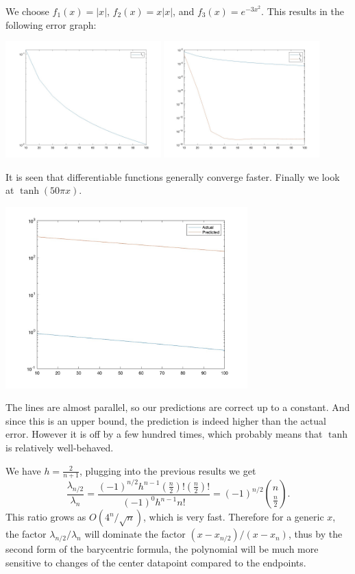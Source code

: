 \documentclass{homework}
\begin{document}
\begin{problem}
We choose \(f_1(x) = |x|\), \(f_2(x) = x|x|\), and \(f_3(x) = e^{-3x^2}\). This results in the following error graph:
\begin{center}
\includegraphics[width=0.45\textwidth]{Hw3-Fig2-1.jpg}
\includegraphics[width=0.45\textwidth]{Hw3-Fig2-2.jpg}
\end{center}
It is seen that differentiable functions generally converge faster. Finally we look at \(\tanh(50\pi x)\).
\begin{center}
\includegraphics[width=0.7\textwidth]{Hw3-Fig3.jpg}
\end{center}
The lines are almost parallel, so our predictions are correct up to a constant. And since this is an upper bound, the prediction is indeed higher than the actual error. However it is off by a few hundred times, which probably means that \(\tanh\) is relatively well-behaved.
\end{problem}

\begin{problem}
We have \(h = \frac2{n+1}\), plugging into the previous results we get
\[\frac{\lambda_{n/2}}{\lambda_n} = \frac{(-1)^{n/2}h^{n-1} (\frac n2)! (\frac n2)!}{(-1)^0 h^{n-1} n!} = (-1)^{n/2} {n \choose \frac n2}.\]
This ratio grows as \(O(4^n / \sqrt n)\), which is very fast. Therefore for a generic \(x\), the factor \(\lambda_{n/2}/\lambda_n\) will dominate the factor \((x - x_{n/2})/(x-x_n)\), thus by the second form of the barycentric formula, the polynomial will be much more sensitive to changes of the center datapoint compared to the endpoints.
\end{problem}
\end{document}
